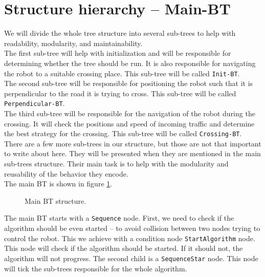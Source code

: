 \section{Structure hierarchy -- Main-BT}
    We will divide the whole tree structure into several sub-trees to help with readability, modularity, and maintainability.\\
    The first sub-tree will help with initialization and will be responsible for determining whether the tree should be run. It is also responsible for navigating the robot to a suitable crossing place. This sub-tree will be called \texttt{Init-BT}.\\
    The second sub-tree will be responsible for positioning the robot such that it is perpendicular to the road it is trying to cross. This sub-tree will be called \texttt{Perpendicular-BT}.\\
    The third sub-tree will be responsible for the navigation of the robot during the crossing. It will check the positions and speed of incoming traffic and determine the best strategy for the crossing. This sub-tree will be called \texttt{Crossing-BT}.\\
    There are a few more sub-trees in our structure, but those are not that important to write about here. They will be presented when they are mentioned in the main sub-trees structure. Their main task is to help with the modularity and reusability of the behavior they encode.\\
    The main BT is shown in figure \ref{fig:main-BT}.\\
    \begin{figure}[ht]
        \caption{Main BT structure.}
        \label{fig:main-BT}
    \end{figure}
    The main BT starts with a \texttt{Sequence} node. First, we need to check if the algorithm should be even started -- to avoid collision between two nodes trying to control the robot. This we achieve with a condition node \texttt{StartAlgorithm} node. This node will check if the algorithm should be started. If it should not, the algorithm will not progress. The second child is a \texttt{SequenceStar} node. This node will tick the sub-trees responsible for the whole algorithm.\\

